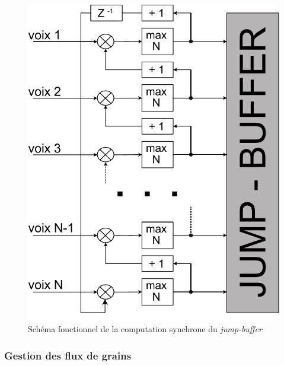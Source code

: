 \begin{figure}[!htbp]
	\captionsetup{format=plain}
	\includegraphics[width=\textwidth]{gfx/04_algorithms/sagrada-jumpBuffer.pdf}
	\caption[Sagrada : schéma fonctionnel de la computation synchrone du \textit{jump-buffer}]{Schéma fonctionnel de la computation synchrone du \textit{jump-buffer}}
	\label{fig:algorithms:sagrada-jumpBuffer}
\end{figure}

\subsubsection{Gestion des flux de grains}

